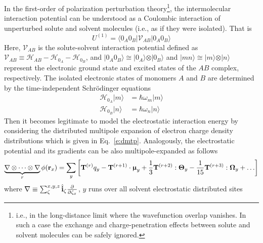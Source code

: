 \documentclass[a4paper,titlepage,twoside,fleqn,12pt]{book}
\newcommand{\BM}[1]{\bm{#1}}
\begin{document}
\begin{refsection}
In the first\hyp{}order of polarization perturbation
theory\footnote{i.e., in the long\hyp{}distance limit 
where the wavefunction overlap vanishes. In such a case the
exchange and charge\hyp{}penetration effects 
between solute and solvent molecules can be safely ignored.}, 
the intermolecular interaction potential
can be understood as a Coulombic interaction
of unperturbed solute and solvent molecules (i.e., 
as if they were isolated).\citep{Jeziorski.Moszynski.Szalewicz.ChemRev.1994,
Stone.TheTheoryOfIntermolecularForces.1996}
That is
%
\begin{equation} \label{e:eint-1}
U^{(1)} = 
\langle 0_A0_B \lvert \mathscr{V}_{AB} \rvert 0_A0_B \rangle 
\end{equation}
%
Here, $\mathscr{V}_{AB}$ is the solute\hyp{}solvent
interaction potential defined as $\mathscr{V}_{AB}\equiv\mathscr{H}_{AB} - \mathscr{H}_{0_A} - \mathscr{H}_{0_B} $,
and $\vert 0_A0_B \rangle \cong \vert 0_A \rangle \otimes \vert 0_B \rangle$
and $\vert mn \rangle \cong \vert m \rangle \otimes \vert n \rangle$
represent the electronic ground state and excited states
of the $AB$ complex, respectively. The isolated electronic states of monomers $A$
and $B$ are determined by the time\hyp{}independent Schr{\"o}dinger
equations
%
\begin{subequations}
 \begin{align}
  \mathscr{H}_{0_A} \vert m \rangle &= \hbar \omega_m \vert m \rangle \\
  \mathscr{H}_{0_B} \vert n \rangle &= \hbar \omega_n \vert n \rangle
 \end{align}
\end{subequations}
%
Then it becomes legitimate to model the electrostatic interaction
energy by considering the distributed multipole expansion of electron
charge density distributions\citep{Stone.TheTheoryOfIntermolecularForces.1996}
which is given in Eq.~\eqref{e:dmtp}. Analogously,
the electrostatic potential and its gradients
can be also multipole\hyp{}expanded as follows
%
\begin{equation} \label{e:potential-gradients}
\underbrace{\nabla \otimes \cdots \otimes \nabla}_{r} \phi({\bf r}_x) = 
\sum_y \left[ 
{\bf T}^{(r)} q_y - {\bf T}^{(r+1)} \cdot {\BM \upmu}_y + 
 \frac{1}{3} {\bf T}^{(r+2)} : {\BM \Theta}_y - 
\frac{1}{15} {\bf T}^{(r+3)} : {\BM \Omega}_y + \ldots
\right]
\end{equation}
%
where 
$\nabla \equiv \sum_{\zeta}^{x,y,z} \hat{\bf i}_\zeta \frac{\partial}{\partial \zeta_x}$, 
$y$ runs over all solvent electrostatic distributed sites

\end{refsection}
\end{document}
